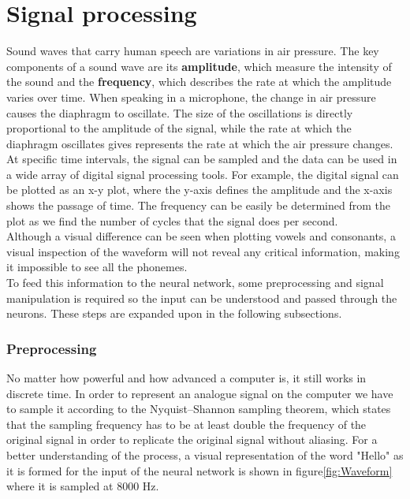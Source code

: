 \section{Signal processing}

Sound waves that carry human speech are variations in air pressure. The key components of a sound wave are its \textbf{amplitude}, which measure the intensity of the sound and the \textbf{frequency}, which describes the rate at which the amplitude varies over time. When speaking in a microphone, the change in air pressure causes the diaphragm to oscillate. The size of the oscillations is directly proportional to the amplitude of the signal, while the rate at which the diaphragm oscillates gives represents the rate at which the air pressure changes. At specific time intervals, the signal can be sampled and the data can be used in a wide array of digital signal processing tools. For example, the digital signal can be plotted as an x-y plot, where the y-axis defines the amplitude and the x-axis shows the passage of time. The frequency can be easily be determined from the plot as we find the number of cycles that the signal does per second.\\

Although a visual difference can be seen when plotting vowels and consonants, a visual inspection of the waveform will not reveal any critical information, making it impossible to see all the phonemes.\\
To feed this information to the neural network, some preprocessing and signal manipulation is required so the input can be understood and passed through the neurons. These steps are expanded upon in the following subsections.

\subsubsection{ Preprocessing}

No matter how powerful and how advanced a computer is, it still works in discrete time. In order to represent an analogue signal on the computer we have to sample it according to the Nyquist–Shannon sampling theorem, which states that the sampling frequency has to be at least double the frequency of the original signal in order to replicate the original signal without aliasing. For a better understanding of the process, a visual representation of the word "Hello" as it is formed for the input of the neural network is shown in figure\ref{fig:Waveform} where it is sampled at 8000 Hz.

